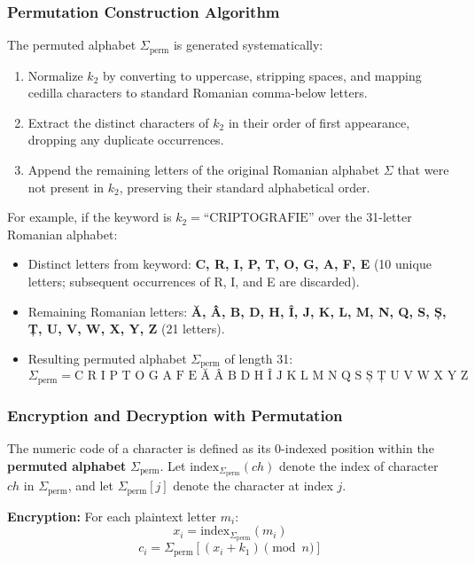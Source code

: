 \documentclass[12pt,a4paper]{article}
\begin{document}
\subsubsection{Permutation Construction Algorithm}
The permuted alphabet $\Sigma_{\text{perm}}$ is generated systematically:
\begin{enumerate}
    \item Normalize $k_2$ by converting to uppercase, stripping spaces, and mapping cedilla characters to standard Romanian comma-below letters.
    \item Extract the distinct characters of $k_2$ in their order of first appearance, dropping any duplicate occurrences.
    \item Append the remaining letters of the original Romanian alphabet $\Sigma$ that were not present in $k_2$, preserving their standard alphabetical order.
\end{enumerate}

For example, if the keyword is $k_2 = \text{``CRIPTOGRAFIE''}$ over the 31-letter Romanian alphabet:
\begin{itemize}
    \item Distinct letters from keyword: \textbf{C, R, I, P, T, O, G, A, F, E} (10 unique letters; subsequent occurrences of R, I, and E are discarded).
    \item Remaining Romanian letters: \textbf{Ă, Â, B, D, H, Î, J, K, L, M, N, Q, S, Ș, Ț, U, V, W, X, Y, Z} (21 letters).
    \item Resulting permuted alphabet $\Sigma_{\text{perm}}$ of length 31:
    $$\Sigma_{\text{perm}} = \text{C R I P T O G A F E Ă Â B D H Î J K L M N Q S Ș Ț U V W X Y Z}$$
\end{itemize}

\subsubsection{Encryption and Decryption with Permutation}
The numeric code of a character is defined as its 0-indexed position within the \textbf{permuted alphabet} $\Sigma_{\text{perm}}$.
Let $\text{index}_{\Sigma_{\text{perm}}}(ch)$ denote the index of character $ch$ in $\Sigma_{\text{perm}}$, and let $\Sigma_{\text{perm}}[j]$ denote the character at index $j$.

\textbf{Encryption:}
For each plaintext letter $m_i$:
\begin{equation}
    x_i = \text{index}_{\Sigma_{\text{perm}}}(m_i)
\end{equation}
\begin{equation}
    c_i = \Sigma_{\text{perm}}[(x_i + k_1) \pmod n]
\end{equation}
\end{document}
